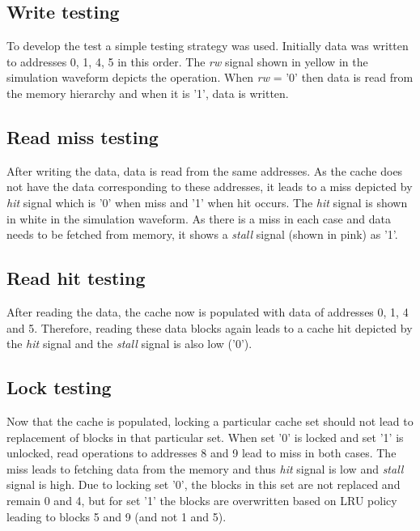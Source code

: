 \documentclass[letterpaper,preprint,11pt]{elsarticle}
\begin{document}
\subsection{Write testing}
To develop the test a simple testing strategy was used. Initially data was written to addresses 0, 1, 4, 5 in this order. The \textit{rw} signal shown in yellow in the simulation waveform depicts the operation. When \textit{rw} = '0' then data is read from the memory hierarchy and when it is '1', data is written. 

\subsection{Read miss testing}
After writing the data, data is read from the same addresses. As the cache does not have the data corresponding to these addresses, it leads to a miss depicted by \textit{hit} signal which is '0' when miss and '1' when hit occurs. The \textit{hit} signal is shown in white in the simulation waveform. As there is a miss in each case and data needs to be fetched from memory, it shows a \textit{stall} signal (shown in pink) as '1'.

\subsection{Read hit testing}
After reading the data, the cache now is populated with data of addresses 0, 1, 4 and 5. Therefore, reading these data blocks again leads to a cache hit depicted by the \textit{hit} signal and the \textit{stall} signal is also low ('0'). 

\subsection{Lock testing}
Now that the cache is populated, locking a particular cache set should not lead to replacement of blocks in that particular set. When set '0' is locked and set '1' is unlocked, read operations to addresses 8 and 9 lead to miss in both cases. The miss leads to fetching data from the memory and thus \textit{hit} signal is low and \textit{stall} signal is high. Due to locking set '0', the blocks in this set are not replaced and remain 0 and 4, but for set '1' the blocks are overwritten based on LRU policy leading to blocks 5 and 9 (and not 1 and 5). 
 
\end{document}
